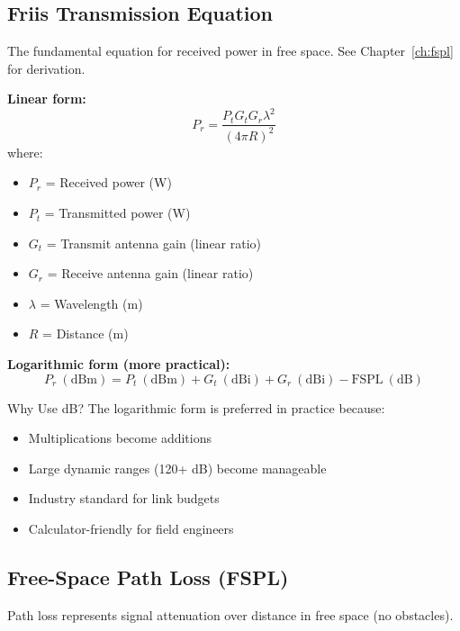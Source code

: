 \subsection{Friis Transmission Equation}
\label{sec:friis-equation}

The fundamental equation for received power in free space. See Chapter~\ref{ch:fspl} for derivation.

\textbf{Linear form:}
\begin{equation}
P_r = \frac{P_t G_t G_r \lambda^2}{(4\pi R)^2}
\label{eq:friis-linear}
\end{equation}
where:
\begin{itemize}
\item $P_r$ = Received power (W)
\item $P_t$ = Transmitted power (W)
\item $G_t$ = Transmit antenna gain (linear ratio)
\item $G_r$ = Receive antenna gain (linear ratio)
\item $\lambda$ = Wavelength (m)
\item $R$ = Distance (m)
\end{itemize}

\textbf{Logarithmic form (more practical):}
\begin{equation}
P_r\ (\text{dBm}) = P_t\ (\text{dBm}) + G_t\ (\text{dBi}) + G_r\ (\text{dBi}) - \text{FSPL}\ (\text{dB})
\label{eq:friis-db}
\end{equation}

\begin{calloutbox}{Why Use dB?}
The logarithmic form is preferred in practice because:
\begin{itemize}
\item Multiplications become additions
\item Large dynamic ranges (120+ dB) become manageable
\item Industry standard for link budgets
\item Calculator-friendly for field engineers
\end{itemize}
\end{calloutbox}

\subsection{Free-Space Path Loss (FSPL)}
\label{sec:fspl}

Path loss represents signal attenuation over distance in free space (no obstacles).

